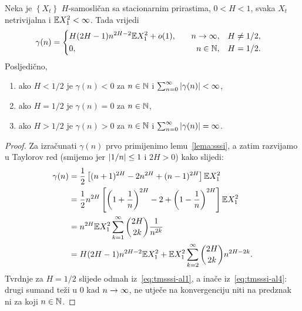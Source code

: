 \documentclass[main.tex]{subfiles}
\begin{document}
\begin{teorem}
	Neka je \( \left\{ X_t \right\} \) \( H \)-samosličan sa stacionarnim prirastima, \( 0 < H < 1 \),
	svaka \( X_t \) netrivijalna i \( \mathbb{E} X_1^2 < \infty \). Tada vrijedi
	\begin{equation}
		\gamma(n)=  \begin{cases}\begin{aligned}
				 & H(2H-1)n^{2H-2}\mathbb{E} X_1^2 + o(1), & \quad n \rightarrow \infty,    & \quad H\neq 1/2, \\
				 & 0,                              & \quad n \in \mathbb{N}, & \quad H=1/2.
			\end{aligned}\end{cases}
	\end{equation}
	Posljedično,
	\begin{enumerate}[label=(\roman*)]
		\item ako \( H < 1/2 \) je \( \gamma(n) < 0 \) za \( n \in \mathbb{N} \) i \( \sum_{n=0}^\infty \left| {\gamma(n)} \right| < \infty \),
		\item ako \( H=1/2 \) je \( \gamma(n)=0 \) za \( n \in \mathbb{N} \),
		\item ako \( H>1/2 \) je \( \gamma(n) > 0\) za \( n \in \mathbb{N} \) i  \( \sum_{n=0}^\infty \left| {\gamma(n)} \right| = \infty \).
	\end{enumerate}
\end{teorem}

\begin{proof}
	Za izračunati \( \gamma(n) \) prvo primijenimo lemu~\ref{lema:sssi}, a zatim
	razvijamo u Taylorov red (smijemo jer \( \left| {1/n} \right| \le 1 \) i \( 2H > 0 \)) kako slijedi:
	\begin{align}
		\gamma(n) & = \frac 12 \left[ (n+1)^{2H} - 2n^{2H} + (n-1)^{2H} \right] \mathbb{E} X_1^2                                          \label{eq:tmsssi-al1} \\
		          & = \frac 12 n^{2H} \left[ \left( 1+\frac 1n \right)^{2H} - 2 + \left( 1-\frac 1n \right)^{2H} \right] \mathbb{E} X_1^2                       \\
		          & = n^{2H} \mathbb{E} X_1^2 \sum_{k=1}^\infty \binom{2H}{2k} \frac 1{n^{2k}}                                                                  \\
		          & = H(2H-1)n^{2H-2}\mathbb{E} X_1^2 + \mathbb{E} X_1^2 \sum_{k=2}^\infty \binom{2H}{2k}n^{2H-2k}.\label{eq:tmsssi-al4}
	\end{align}
	Tvrdnje za \( H=1/2 \) slijede odmah iz~\eqref{eq:tmsssi-al1}, a inače iz~\eqref{eq:tmsssi-al4}: drugi sumand teži u \( 0 \) kad \( n \rightarrow \infty \), ne utječe na konvergenciju niti na
	predznak ni za koji \( n \in \mathbb{N} \).

\end{proof}
\end{document}
